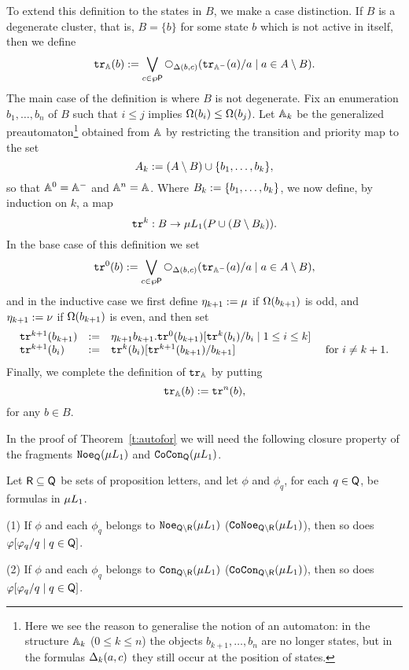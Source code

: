 \begin{definition}
To extend this definition to the states in $B$, we make a case 
distinction.
If $B$ is a degenerate cluster, that is, $B = \{ b \}$ for some state $b$ 
which is not active in itself, then we define
\[
\ytr_{\bbA}(b) \isdef
   \bigvee_{c \in \pow{\pprop}}
   \nxt{\tmap(b,c)}(\ytr_{\bbA^{-}}(a)/a \mid a \in A \setminus B).
\]
The main case of the definition is where $B$ is not degenerate.
Fix an enumeration $b_{1},\ldots,b_{n}$ of $B$ such that $i \leq j$ implies 
$\Omega(b_{i}) \leq \Omega(b_{j})$.
Let $\mathbb{A}_{k}$ be the generalized preautomaton\footnote{%
   Here we see the reason to generalise the notion of an automaton:
   in the structure $\mathbb{A}_{k}$ ($0 \leq k \leq n$) the objects $b_{k+1},\ldots,
   b_{n}$ are no longer states, but in the formulas $\Delta_{k}(a,c)$ they still 
   occur at the position of states.
}
obtained from $\mathbb{A}$ by restricting the transition and priority map to the set
\[
A_{k} \mathrel{:=} (A\setminus B) \cup \{ b_{1},\ldots,b_{k} \},
\]
so that $\mathbb{A}^{0} = \mathbb{A}^{-}$ and $\mathbb{A}^{n} = \mathbb{A}$.
Where $B_{k} \mathrel{:=} \{ b_{1},\ldots,b_{k} \}$, we now define, by induction on 
$k$, a map 
\[
\mathtt{tr}^{k}: B \to \mu L_{1}(P \cup (B \setminus B_{k})).
\]
In the base case of this definition we set
\[
\ytr^{0}(b) \isdef 
   \bigvee_{c \in \pow{\pprop}} 
   \nxt{\tmap(b,c)}(\ytr_{\bbA^{-}}(a)/a \mid a \in A \setminus B),
\]
and in the inductive case we first define $\eta_{k+1} \mathrel{:=} \mu$ if
$\Omega(b_{k+1})$ is odd, and $\eta_{k+1} \mathrel{:=} \nu$ if $\Omega(b_{k+1})$ is 
even, and then set
\[\begin{array}{llll}
     \ytr^{k+1}(b_{k+1}) &\isdef &
   \eta_{k+1} b_{k+1}. \ytr^{0}(b_{k+1})[\ytr^{k}(b_{i})/b_{i} \mid 1 \leq i\leq k]
\\ \ytr^{k+1}(b_{i}) &\isdef &
   \ytr^{k}(b_{i})[\ytr^{k+1}(b_{k+1})/b_{k+1}]
   & \text{ for } i \neq k+1.
\end{array}\]
Finally, we complete the definition of $\mathtt{tr}_{\mathbb{A}}$ by putting
\[
\mathtt{tr}_{\mathbb{A}}(b) \mathrel{:=} \mathtt{tr}^{n}(b),
\]
for any $b \in B$.
\end{definition}

In the proof of Theorem~\ref{t:autofor} we will need the following closure 
property of the fragments $\mathtt{Noe}_{\mathsf{Q}}(\mu L_{1})$ and 
$\mathtt{CoCon}_{\mathsf{Q}}(\mu L_{1})$.

\begin{proposition}
\label{p:comp}
Let $\mathsf{R} \subseteq \mathsf{Q}$ be sets of proposition letters, and let $\phi$ 
and $\phi_{q}$, for each $q \in \mathsf{Q}$, be formulas in $\mu L_{1}$.

(1) If $\phi$ and each $\phi_{q}$ belongs to 
    $\mathtt{Noe}_{\mathsf{Q}\setminus\mathsf{R}}(\mu L_{1})$ 
    ($\mathtt{CoNoe}_{\mathsf{Q}\setminus\mathsf{R}}(\mu L_{1})$), 
   then so does $\varphi[\varphi_{q}/q \mid q \in \mathsf{Q}]$.

(2) If $\phi$ and each $\phi_{q}$ belongs to
   $\mathtt{Con}_{\mathsf{Q}\setminus\mathsf{R}}(\mu L_{1})$
   ($\mathtt{CoCon}_{\mathsf{Q}\setminus\mathsf{R}}(\mu L_{1})$), 
   then so does $\varphi[\varphi_{q}/q \mid q \in \mathsf{Q}]$.
\end{proposition}

